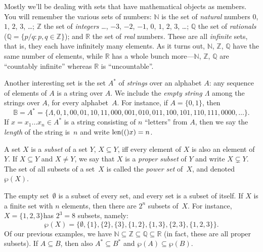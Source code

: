 \documentclass[misc]{subfiles}
\begin{document}
Mostly we'll be dealing with sets that have mathematical objects as
members. You will remember the various sets of numbers: $\mathbb{N}$
is the set of \emph{natural} numbers $0$, $1$, $2$, $3$, \dots{};
$\mathbb{Z}$ the set of \emph{integers} \dots{}, $-3$, $-2$,
$-1$, $0$, $1$, $2$, $3$, \dots{}; $\mathbb{Q}$ the set of
\emph{rationals} ($\mathbb{Q}=\{p/q : p,q\in\mathbb{Z}\}$); and
$\mathbb{R}$ the set of \emph{real} numbers. These are all \emph{infinite}
sets, that is, they each have infinitely many elements. As it turns
out, $\mathbb{N}$, $\mathbb{Z}$, $\mathbb{Q}$ have the same number
of elements, while $\mathbb{R}$ has a whole bunch more---$\mathbb{N}$,
$\mathbb{Z}$, $\mathbb{Q}$ are ``countably infinite'' whereas
$\mathbb{R}$ is ``uncountable''.

\begin{ex}\label{ex:strings}
Another interesting set is the set $A^{*}$ of
\emph{strings} over an alphabet $A$: any sequence of elements of
$A$ is a string over $A$. We include the \emph{empty string $\Lambda$}
among the strings over $A$, for every alphabet~$A$. For instance,
if $A = \{0,1\}$, then 
\[
\mathbb{B}=A^{*}=\{\Lambda,0,1,00,01,10,11,000,001,010,011,100,101,110,111,0000,\ldots\}.
\]
 If $x=x_{1}\ldots x_{n}\in A^{*}$ is a string consisting of $n$
``letters'' from $A$, then we say the \emph{length} of the string is~$n$
and write $\mathrm{len}(()x)=n$.
\end{ex}

\begin{defn}
A set $X$ is a \emph{subset} of a set $Y$, $X \subseteq Y$, iff every
element of $X$ is also an element of $Y$. If $X\subseteq Y$ and
$X\neq Y$, we say that $X$ is a \emph{proper subset} of $Y$ and
write $X\subsetneq Y$. The set of all subsets of a set~$X$ is called
the \emph{power set} of~$X$, and denoted~$\wp(X)$.
\end{defn}

\begin{ex}
The empty set~$\emptyset$ is a subset of every set, and every set
is a subset of itself. If $X$ is a finite set with $n$ elements,
then there are $2^{n}$ subsets of~$X$. For instance, $X=\{1,2,3\}$has
$2^{3}=8$ subsets, namely:
\[
\wp(X)=\{\emptyset,\{1\},\{2\},\{3\},\{1,2\},\{1,3\},\{2,3\},\{1,2,3\}\}.
\]
Of our previous examples, we have $\mathbb{N}\subseteq\mathbb{Z}\subseteq\mathbb{Q}\subseteq\mathbb{R}$
(in fact, these are all proper subsets). If $A\subseteq B$, then
also $A^{*}\subseteq B^{*}$ and $\wp(A) \subseteq \wp(B)$. 
\end{ex}
\end{document}
